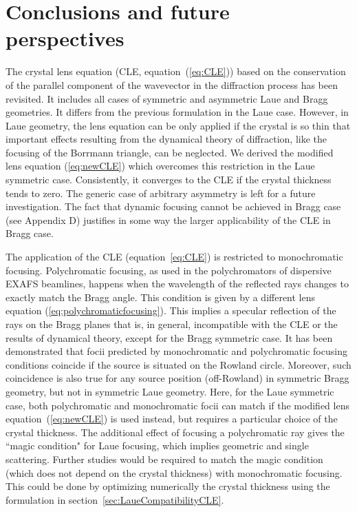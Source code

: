 \documentclass[preprint]{iucr}              %
\newcommand{\inred}[1]{{\color{red}#1}}
\begin{document}
\section{Conclusions \inred{and future perspectives}}
\label{sec:summary}


\inred{The} crystal lens equation (CLE, equation~(\ref{eq:CLE})) based on the conservation of the parallel component of the wavevector in the diffraction process \inred{has been revisited}. It includes all cases of symmetric and asymmetric Laue and Bragg geometries. It differs from the previous formulation \cite{CK} in the Laue case. However, \inred{in Laue geometry,} the lens equation 
can be only applied if the crystal is \inred{so thin that} important effects resulting from the dynamical theory of diffraction, like the focusing of the Borrmann triangle, \inred{can be neglected}. We derived the modified lens equation (\ref{eq:newCLE}) which overcomes this restriction \inred{in the Laue symmetric case}. Consistently, it converges to the CLE if the crystal thickness \inred{tends to zero}. The generic case of arbitrary asymmetry is left for a future investigation.
\inred{The fact that dynamic focusing cannot be achieved in Bragg case (see Appendix D) justifies in some way the larger applicability of the CLE in Bragg case. }


The application of the CLE (equation~\ref{eq:CLE}) is restricted to monochromatic focusing. Polychromatic focusing, as used in the polychromators of dispersive EXAFS beamlines, happens when the wavelength of the reflected rays changes to exactly match the Bragg angle. This condition is given by a different lens equation (\ref{eq:polychromaticfocusing}). This implies a specular reflection of the rays on the Bragg planes that is, in general, incompatible with the CLE or the results of dynamical theory, except for the Bragg symmetric case. It has been demonstrated that focii predicted by monochromatic and polychromatic focusing conditions coincide if the source is situated on the Rowland circle. Moreover, such coincidence is also true for any source position (off-Rowland) in symmetric Bragg geometry, but not in symmetric Laue geometry. Here, for the Laue symmetric case, both polychromatic and monochromatic focii can match if the modified lens equation~(\ref{eq:newCLE}) is used instead, but requires a particular choice of the crystal thickness.
\inred{The additional effect of focusing a polychromatic ray \cite{PengQi2021} gives the ``magic condition"  for Laue focusing, which implies geometric and single scattering. Further studies would be required to match the magic condition (which does not depend on the crystal thickness) with monochromatic focusing. This could be done by optimizing numerically the crystal thickness using the formulation in section~\ref{sec:LaueCompatibilityCLE}. }
\end{document}
